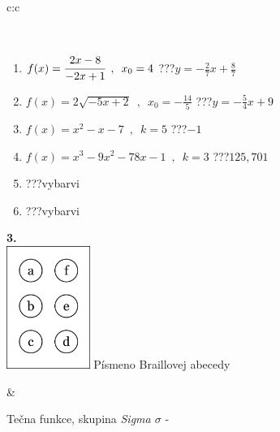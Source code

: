 \documentclass[10pt]{report}
\begin{document}
\begin{tabular}{c:c}
\begin{minipage}[c][104.5mm][t]{0.5\linewidth}
\begin{center}
\begin{minipage}{0.95\linewidth}
\begin{center}
\end{center}
\end{minipage}
\\[1mm]
\begin{minipage}{0.79\linewidth}
\begin{center}
\begin{varwidth}{\linewidth}
\begin{enumerate}
\small
\item $f(x)=\cfrac{2x-8}{-2x+1}\enspace , \enspace x_0=4$\quad \dotfill\; ???\;\dotfill \quad $y = -\frac{2}{7}x+\frac{8}{7}$
\item $f(x)=2\sqrt{-5x+2}\enspace , \enspace x_0=-\frac{14}{5}$\quad \dotfill\; ???\;\dotfill \quad $y = -\frac{5}{4}x+9$
\item $f(x)=x^2-x-7\enspace , \enspace k=5$\quad \dotfill\; ???\;\dotfill \quad $-1$
\item $f(x)=x^3-9x^2-78x-1\enspace , \enspace k=3$\quad \dotfill\; ???\;\dotfill \quad $125 , 701$
\item \quad \dotfill\; ???\;\dotfill \quad vybarvi
\item \quad \dotfill\; ???\;\dotfill \quad vybarvi
\end{enumerate}
\end{varwidth}
\end{center}
\end{minipage}
\begin{minipage}{0.20\linewidth}
\begin{center}
{\Huge\bfseries 3.} \\[2mm]
\includegraphics[height=40mm]{../images/braille.png}
{\small Písmeno Braillovej abecedy}
\end{center}
\end{minipage}
\end{center}
\end{minipage}
&
\begin{minipage}[c][104.5mm][t]{0.5\linewidth}
\begin{center}
\vspace{7mm}
{\huge Tečna funkce, skupina \textit{Sigma $\sigma$} -}\\[5mm]

\end{center}
\end{minipage}
\end{tabular}
\end{document}
